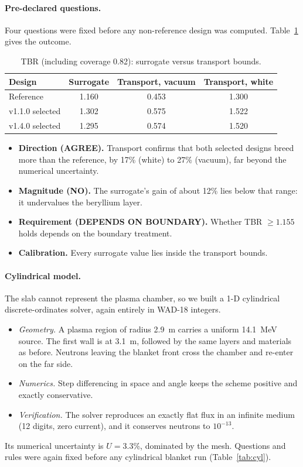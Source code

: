 \documentclass[11pt]{article}
\begin{document}
\paragraph{Pre-declared questions.} Four questions were fixed before any non-reference design was computed.
Table~\ref{tab:tr} gives the outcome.

\begin{table}[h]
\centering
\caption{TBR (including coverage 0.82): surrogate versus transport bounds.}
\label{tab:tr}
\begin{tabular}{lccc}
\toprule
Design & Surrogate & Transport, vacuum & Transport, white \\
\midrule
Reference & 1.160 & 0.453 & 1.300 \\
v1.1.0 selected & 1.302 & 0.575 & 1.522 \\
v1.4.0 selected & 1.295 & 0.574 & 1.520 \\
\bottomrule
\end{tabular}
\end{table}

\begin{itemize}[leftmargin=1.2em]
  \item \textbf{Direction (AGREE).} Transport confirms that both selected designs breed more than the reference,
  by 17\% (white) to 27\% (vacuum), far beyond the numerical uncertainty.
  \item \textbf{Magnitude (NO).} The surrogate's gain of about 12\% lies below that range: it undervalues the
  beryllium layer.
  \item \textbf{Requirement (DEPENDS ON BOUNDARY).} Whether TBR $\ge 1.155$ holds depends on the boundary
  treatment.
  \item \textbf{Calibration.} Every surrogate value lies inside the transport bounds.
\end{itemize}

\paragraph{Cylindrical model.} The slab cannot represent the plasma chamber, so we built a 1-D cylindrical
discrete-ordinates solver, again entirely in WAD-18 integers.
\begin{itemize}[leftmargin=1.2em]
  \item \emph{Geometry.} A plasma region of radius 2.9~m carries a uniform 14.1~MeV source. The first wall is
  at 3.1~m, followed by the same layers and materials as before. Neutrons leaving the blanket front cross the
  chamber and re-enter on the far side.
  \item \emph{Numerics.} Step differencing in space and angle keeps the scheme positive and exactly conservative.
  \item \emph{Verification.} The solver reproduces an exactly flat flux in an infinite medium (12 digits, zero
  current), and it conserves neutrons to $10^{-13}$.
\end{itemize}
Its numerical uncertainty is $U = 3.3\%$, dominated by the mesh. Questions and rules were again fixed before
any cylindrical blanket run (Table~\ref{tab:cyl}).
\end{document}
